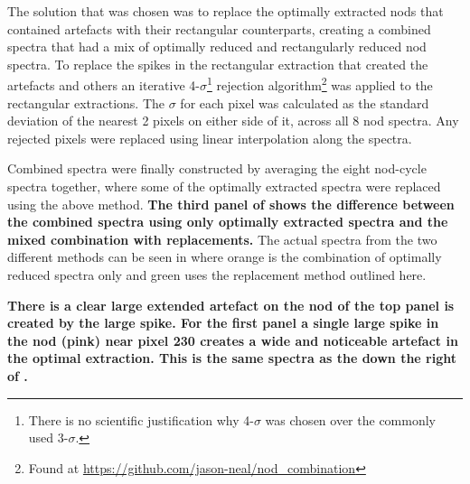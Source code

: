 The solution that was chosen was to replace the optimally extracted nods that contained artefacts with their rectangular counterparts, creating a combined spectra that had a mix of optimally reduced and rectangularly reduced nod spectra.
To replace the spikes in the rectangular extraction that created the artefacts and others an iterative 4-\(\sigma\)\footnote{There is no scientific justification why 4-\(\sigma\) was chosen over the commonly used 3-\(\sigma\).} rejection algorithm\footnote{Found at \url{https://github.com/jason-neal/nod_combination}} was applied to the rectangular extractions. The \(\sigma\) for each pixel was calculated as the standard deviation of the nearest 2 pixels on either side of it, across all 8 nod spectra. Any rejected pixels were replaced using linear interpolation along the spectra.


Combined spectra were finally constructed by averaging the eight nod-cycle spectra together, where some of the optimally extracted spectra were replaced using the above method. \textbf{The third panel of  shows the difference between the combined spectra using only optimally extracted spectra and the mixed combination with replacements.} The actual spectra from the two different methods can be seen in  where orange is the combination of optimally reduced spectra only and green uses the replacement method outlined here.


\textbf{There is a clear large extended artefact on the  nod of the top panel is created by the large spike. For the first panel a single large spike in the  nod (pink) near pixel 230 creates a wide and noticeable artefact in the optimal extraction. This is the same spectra as the  down the right of .
}

